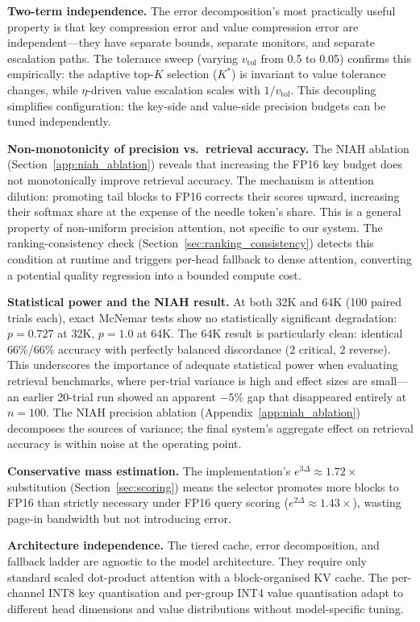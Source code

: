 \documentclass[11pt,a4paper]{article}
\theoremstyle{definition}
\theoremstyle{remark}
\begin{document}
\textbf{Two-term independence.}  The error decomposition's most practically useful property is that key compression error and value compression error are independent---they have separate bounds, separate monitors, and separate escalation paths.  The tolerance sweep (varying $v_{\mathrm{tol}}$ from 0.5 to 0.05) confirms this empirically: the adaptive top-$K$ selection ($K^*$) is invariant to value tolerance changes, while $\eta$-driven value escalation scales with $1/v_{\mathrm{tol}}$.  This decoupling simplifies configuration: the key-side and value-side precision budgets can be tuned independently.

\textbf{Non-monotonicity of precision vs.\ retrieval accuracy.}  The NIAH ablation (Section~\ref{app:niah_ablation}) reveals that increasing the FP16 key budget does not monotonically improve retrieval accuracy.  The mechanism is attention dilution: promoting tail blocks to FP16 corrects their scores upward, increasing their softmax share at the expense of the needle token's share.  This is a general property of non-uniform precision attention, not specific to our system.  The ranking-consistency check (Section~\ref{sec:ranking_consistency}) detects this condition at runtime and triggers per-head fallback to dense attention, converting a potential quality regression into a bounded compute cost.

\textbf{Statistical power and the NIAH result.}  At both 32K and 64K (100 paired trials each), exact McNemar tests show no statistically significant degradation: $p{=}0.727$ at 32K, $p{=}1.0$ at 64K.  The 64K result is particularly clean: identical 66\%/66\% accuracy with perfectly balanced discordance (2 critical, 2 reverse).  This underscores the importance of adequate statistical power when evaluating retrieval benchmarks, where per-trial variance is high and effect sizes are small---an earlier 20-trial run showed an apparent $-5\%$ gap that disappeared entirely at $n{=}100$.  The NIAH precision ablation (Appendix~\ref{app:niah_ablation}) decomposes the sources of variance; the final system's aggregate effect on retrieval accuracy is within noise at the operating point.

\textbf{Conservative mass estimation.}  The implementation's $e^{3\Delta} \approx 1.72\times$ substitution (Section~\ref{sec:scoring}) means the selector promotes more blocks to FP16 than strictly necessary under FP16 query scoring ($e^{2\Delta} \approx 1.43\times$), wasting page-in bandwidth but not introducing error.

\textbf{Architecture independence.}  The tiered cache, error decomposition, and fallback ladder are agnostic to the model architecture.  They require only standard scaled dot-product attention with a block-organised KV cache.  The per-channel INT8 key quantisation and per-group INT4 value quantisation adapt to different head dimensions and value distributions without model-specific tuning.
\end{document}
